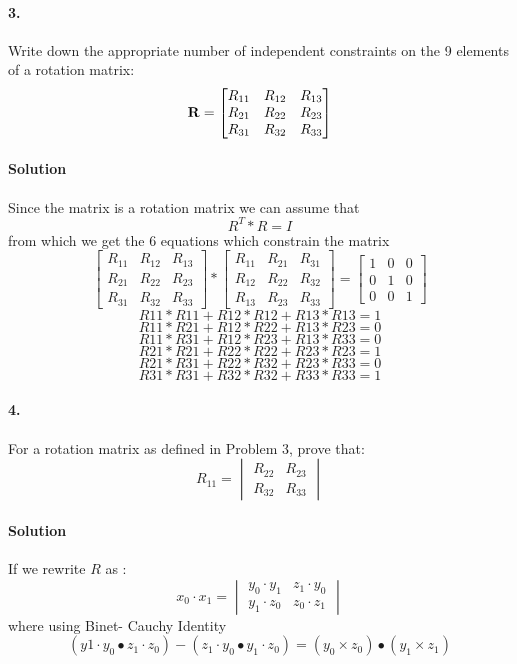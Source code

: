 \documentclass[english]{article}
\begin{document}
\paragraph{3.}

Write down the appropriate number of  independent constraints on the 9 elements of a rotation matrix: 
\[
{\bf R} = \begin{bmatrix} R_{11} & R_{12} & R_{13}  \\
R_{21} & R_{22} & R_{23}  \\
R_{31} & R_{32} & R_{33} \end{bmatrix}
\]
\paragraph{Solution}
Since the matrix is a rotation matrix we can assume that 
$$R^{T}*R = I$$ 
from which we get the 6 equations which constrain the matrix 
 $$\begin{bmatrix} R_{11} & R_{12} & R_{13}  \\
R_{21} & R_{22} & R_{23}  \\
R_{31} & R_{32} & R_{33} \end{bmatrix}
 *  \begin{bmatrix} R_{11} & R_{21} & R_{31}  \\
R_{12} & R_{22} & R_{32}  \\
R_{13} & R_{23} & R_{33} \end{bmatrix} = \begin{bmatrix}
1 & 0 & 0\\
0 & 1 & 0 \\ 
0& 0 & 1\end{bmatrix}
$$
$$
R{11}*R{11} + R{12}*R{12}+ R{13}*R{13} = 1 $$
$$
R{11}*R{21} + R{12}*R{22}+ R{13}*R{23} = 0 $$
$$
R{11}*R{31} + R{12}*R{23}+ R{13}*R{33} = 0$$ 
$$
R{21}*R{21} + R{22}*R{22}+ R{23}*R{23} = 1$$
$$ 
R{21}*R{31} + R{22}*R{32}+ R{23}*R{33} = 0 $$
$$
 R{31}*R{31} + R{32}*R{32}+ R{33}*R{33} = 1 $$



\paragraph{4.} 

For a rotation matrix as defined in Problem 3, prove that: 
\[
R_{11} = \begin{vmatrix}
R_{22} & R_{23}  \\
R_{32} & R_{33} \end{vmatrix}
\] 
\paragraph{Solution}
If we rewrite $R$ as : 
$$
x_0\cdot x_1= \begin{vmatrix}
y_0\cdot y_1 &z_1\cdot y_0   \\
y_1\cdot z_0 &z_0\cdot z_1  \end{vmatrix}
$$
where using Binet- Cauchy Identity 
$$(y1 \cdot y_0 \bullet z_1 \cdot z_0) - (z_1 \cdot y_0 \bullet y_1 \cdot z_0 )  = (y_0 \times z_0)  \bullet (y_1 \times z_1) $$
\end{document}
